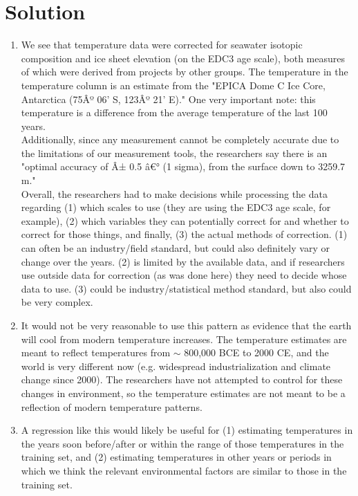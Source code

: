 \documentclass[submit]{harvardml}
\newenvironment{solution}
  {\color{blue}\section*{Solution}}
{}
\begin{document}
\begin{solution}

\begin{enumerate}
    \item We see that temperature data were corrected for seawater isotopic composition and ice sheet elevation (on the EDC3 age scale), both measures of which were derived from projects by other groups. The temperature in the temperature column is an estimate from the "EPICA Dome C Ice Core, Antarctica (75Âº 06' S, 123Âº 21' E)." One very important note: this temperature is a difference from the average temperature of the last 100 years. \\
    
    Additionally, since any measurement cannot be completely accurate due to the limitations of our measurement tools, the researchers say there is an "optimal accuracy of Â± 0.5 â€° (1 sigma), from the surface down to 3259.7 m."\\

    Overall, the researchers had to make decisions while processing the data regarding (1) which scales to use (they are using the EDC3 age scale, for example), (2) which variables they can potentially correct for and whether to correct for those things, and finally, (3) the actual methods of correction. (1) can often be an industry/field standard, but could also definitely vary or change over the years. (2) is limited by the available data, and if researchers use outside data for correction (as was done here) they need to decide whose data to use. (3) could be industry/statistical method standard, but also could be very complex.
    \item It would not be very reasonable to use this pattern as evidence that the earth will cool from modern temperature increases. The temperature estimates are meant to reflect temperatures from $\sim$ 800,000 BCE to 2000 CE, and the world is very different now (e.g. widespread industrialization and climate change since 2000). The researchers have not attempted to control for these changes in environment, so the temperature estimates are not meant to be a reflection of modern temperature patterns.
    \item A regression like this would likely be useful for (1) estimating temperatures in the years soon before/after or within the range of those temperatures in the training set, and (2) estimating temperatures in other years or periods in which we think the relevant environmental factors are similar to those in the training set.
\end{enumerate}
 
\end{solution}
\newpage
\end{document}
